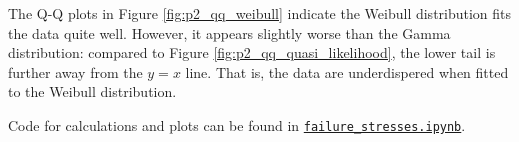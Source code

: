 \documentclass[letterpaper,11pt]{article}
\begin{document}
\begin{enumerate}
\begin{enumerate}
\begin{description}
    The Q-Q plots in Figure \ref{fig:p2_qq_weibull} indicate the Weibull
    distribution fits the data quite well. However, it appears slightly worse
    than the Gamma distribution: compared to Figure
    \ref{fig:p2_qq_quasi_likelihood}, the lower tail is further away from the
    $y = x$ line. That is, the data are underdispered when fitted to the Weibull
    distribution.

    Code for calculations and plots can be found in
    \href{https://nbviewer.jupyter.org/github/ppham27/stat570/blob/master/hw3/failure\_stresses.ipynb}{\texttt{failure\_stresses.ipynb}}.
  \end{description}
\end{enumerate}
\end{enumerate}
\end{document}
